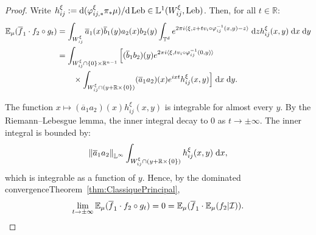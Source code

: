 \documentclass[AHL,Unicode,longabstracts]{cedram}
\DeclareMathOperator{\Leb}{Leb}
\newcommand{\R}{\mathbb{R}}
\newcommand{\Ebb}{\mathbb{E}}
\newcommand{\Lbb}{\mathbb{L}}
\newcommand{\Tbb}{\mathbb{T}}
\newcommand{\Ical}{\mathcal{I}}
\newcommand{\dd}{\;{\rm d}}
\newcommand{\de}{{\rm d}}
\newcommand{\norm}[2]{\left\| #1 \right\|_{#2}}
\begin{document}
\begin{proof}

Write $h_{ij}^\xi := \de (\varphi_{ij,*}^\xi \pi_* \mu) / \de \Leb \in \Lbb^1 (W_{ij}^\xi, \Leb)$. Then, for all $t \in \R$:
\begin{align*}
\Ebb_\mu (\overline{f}_1 \cdot f_2 \circ g_t) & = \int_{W_{ij}^\xi} \overline{a}_1(x) \overline{b}_1(y) a_2(x) b_2(y) \int_{\Tbb^d} e^{2\pi i \langle \xi, z+tv_i \circ \varphi_{ij}^{-1}(x,y)-z \rangle} \dd z h_{ij}^\xi (x,y) \dd x \dd y \\
& = \int_{W_{ij}^\xi \cap \{0\} \times \R^{n-1}} \Big[(\overline{b}_1 b_2) (y) e^{2\pi i \langle \xi, tv_i \circ \varphi_{ij}^{-1}(0,y) \rangle} \\
& \hspace{2em} \times \int_{W_{ij}^\xi \cap (y+\R\times\{0\})} (\overline{a}_1 a_2)(x) e^{ixt} h_{ij}^\xi (x,y) \Big] \dd x \dd y.
\end{align*}

The function $x \mapsto (\overline{a}_1 a_2)(x) h_{ij}^\xi (x,y)$ is integrable for almost every $y$. By the Riemann--Lebesgue lemma, the inner integral decay to $0$ as $t \to \pm \infty$. The inner integral is bounded by:
\[
\norm{\overline{a}_1 a_2}{\Lbb^\infty} \int_{W_{ij}^\xi \cap (y+\R\times\{0\})} h_{ij}^\xi (x,y) \dd x,
\]
which is integrable as a function of $y$. Hence, by the dominated convergence\linebreak Theorem~\ref{thm:ClassiquePrincipal},
\[
\lim_{t \to \pm \infty} \Ebb_\mu (\overline{f}_1 \cdot f_2 \circ g_t) = 0 = \Ebb_\mu (\overline{f}_1 \cdot \Ebb_\mu (f_2| \Ical)). \qedhere
\]
\end{proof}
\end{document}
